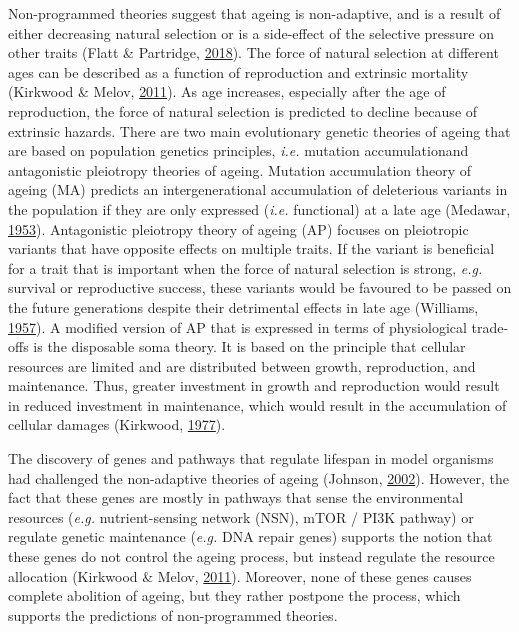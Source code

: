 \documentclass[12pt,twoside]{unicam}
\begin{document}
Non-programmed theories suggest that ageing is non-adaptive, and is a result of either decreasing natural selection or is a side-effect of the selective pressure on other traits (Flatt \& Partridge, \protect\hyperlink{ref-Flatt2018}{2018}). The force of natural selection at different ages can be described as a function of reproduction and extrinsic mortality (Kirkwood \& Melov, \protect\hyperlink{ref-Kirkwood2011}{2011}). As age increases, especially after the age of reproduction, the force of natural selection is predicted to decline because of extrinsic hazards. There are two main evolutionary genetic theories of ageing that are based on population genetics principles, \emph{i.e.} mutation accumulationand antagonistic pleiotropy theories of ageing. Mutation accumulation theory of ageing (MA) predicts an intergenerational accumulation of deleterious variants in the population if they are only expressed (\emph{i.e.} functional) at a late age (Medawar, \protect\hyperlink{ref-Medawar1953}{1953}). Antagonistic pleiotropy theory of ageing (AP) focuses on pleiotropic variants that have opposite effects on multiple traits. If the variant is beneficial for a trait that is important when the force of natural selection is strong, \emph{e.g.} survival or reproductive success, these variants would be favoured to be passed on the future generations despite their detrimental effects in late age (Williams, \protect\hyperlink{ref-Williams1957}{1957}). A modified version of AP that is expressed in terms of physiological trade-offs is the disposable soma theory. It is based on the principle that cellular resources are limited and are distributed between growth, reproduction, and maintenance. Thus, greater investment in growth and reproduction would result in reduced investment in maintenance, which would result in the accumulation of cellular damages (Kirkwood, \protect\hyperlink{ref-Kirkwood1977}{1977}).

The discovery of genes and pathways that regulate lifespan in model organisms had challenged the non-adaptive theories of ageing (Johnson, \protect\hyperlink{ref-Johnson2002}{2002}). However, the fact that these genes are mostly in pathways that sense the environmental resources (\emph{e.g.} nutrient-sensing network (NSN), mTOR / PI3K pathway) or regulate genetic maintenance (\emph{e.g.} DNA repair genes) supports the notion that these genes do not control the ageing process, but instead regulate the resource allocation (Kirkwood \& Melov, \protect\hyperlink{ref-Kirkwood2011}{2011}). Moreover, none of these genes causes complete abolition of ageing, but they rather postpone the process, which supports the predictions of non-programmed theories.
\end{document}

